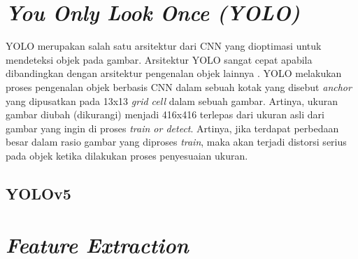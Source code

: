 \section{\textit{You Only Look Once (YOLO)}}
\label{sec:yolo}
YOLO merupakan salah satu arsitektur dari CNN yang dioptimasi untuk mendeteksi objek pada gambar. Arsitektur YOLO sangat cepat apabila dibandingkan dengan arsitektur pengenalan objek lainnya . YOLO melakukan proses pengenalan objek berbasis CNN dalam sebuah kotak yang disebut \textit{anchor} yang dipusatkan pada 13x13 \textit{grid cell} dalam sebuah gambar. Artinya, ukuran gambar diubah (dikurangi) menjadi 416x416 terlepas dari ukuran asli dari gambar yang ingin di proses \textit{train or detect}. Artinya, jika terdapat perbedaan besar dalam rasio gambar yang diproses \textit{train}, maka akan terjadi distorsi serius pada objek ketika dilakukan proses penyesuaian ukuran\citep*{jeong2018image}. \par

\subsection{YOLOv5}
\label{subsec:yolov5}

\section{\textit{Feature Extraction}}
\label{sec:featureextraction}